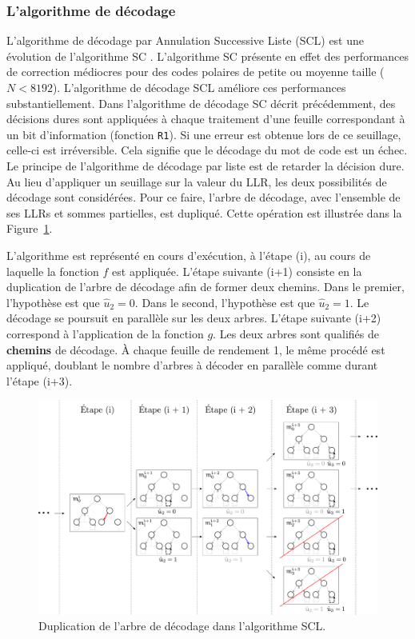\subsubsection{L'algorithme de décodage}
L'algorithme de décodage par Annulation Successive Liste (SCL) est une évolution de l'algorithme SC \cite{tal_list_2011}. L'algorithme SC présente en effet des performances de correction médiocres pour des codes polaires de petite ou moyenne taille ($N < 8192$). L'algorithme de décodage SCL améliore ces performances substantiellement. Dans l'algorithme de décodage SC décrit précédemment, des décisions dures sont appliquées à chaque traitement d'une feuille correspondant à un bit d'information (fonction \texttt{R1}). Si une erreur est obtenue lors de ce seuillage, celle-ci est irréversible. Cela signifie que le décodage du mot de code est un échec. Le principe de l'algorithme de décodage par liste est de retarder la décision dure. Au lieu d'appliquer un seuillage sur la valeur du LLR, les deux possibilités de décodage sont considérées. Pour ce faire, l'arbre de décodage, avec l'ensemble de ses LLRs et sommes partielles, est dupliqué. Cette opération est illustrée dans la Figure~\ref{fig:scl}.

L'algorithme est représenté en cours d'exécution, à l'étape (i), au cours de laquelle la fonction $f$ est appliquée. L'étape suivante (i+1) consiste en la duplication de l'arbre de décodage afin de former deux chemins. Dans le premier, l'hypothèse est que $\hat{u}_2=0$. Dans le second, l'hypothèse est que $\hat{u}_2=1$. Le décodage se poursuit en parallèle sur les deux arbres. L'étape suivante (i+2) correspond à l'application de la fonction $g$. Les deux arbres sont qualifiés de \textbf{chemins} de décodage. \`A chaque feuille de rendement 1, le même procédé est appliqué, doublant le nombre d'arbres à décoder en parallèle comme durant l'étape (i+3).

\begin{figure}[t]
\centering
\includegraphics[width=1\textwidth]{main/ch1_fig/scl}
\caption{Duplication de l'arbre de décodage dans l'algorithme SCL.}
\label{fig:scl}
\end{figure}

